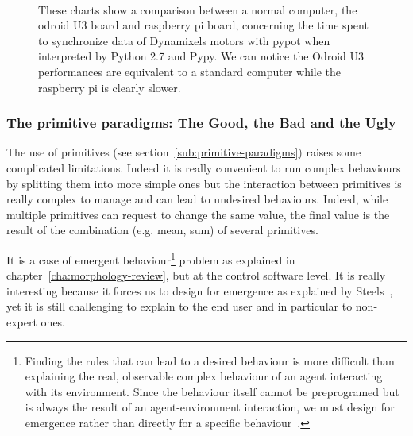 
\begin{figure}[tb]
\centering
    \\
    \hfill
    \caption{These charts show a comparison between a normal computer, the odroid U3 board and raspberry pi board, concerning the time spent to synchronize data of Dynamixels motors with pypot when interpreted by Python 2.7 and Pypy. We can notice the Odroid U3 performances are equivalent to a standard computer while the raspberry pi is clearly slower.}
    \label{fig:pypot-board-comparaison}
\end{figure}



\subsubsection{The primitive paradigms: The Good, the Bad and the Ugly}
\label{sec:pypot-primitives-problems}

The use of primitives (see section~\ref{sub:primitive-paradigms}) raises some complicated limitations. Indeed it is really convenient to run complex behaviours by splitting them into more simple ones but the interaction between primitives is really complex to manage and can lead to undesired behaviours. Indeed, while multiple primitives can request to change the same value, the final value is the result of the combination (e.g. mean, sum) of several primitives.


It is a case of emergent behaviour\footnote{Finding the rules that can lead to a desired behaviour is more difficult than explaining the real, observable complex behaviour of an agent interacting with its environment. Since the behaviour itself cannot be preprogramed but is always the result of an agent-environment interaction, we must design for emergence rather than directly for a specific behaviour~\parencite{Pfeifer06}.} problem as explained in chapter~\ref{cha:morphology-review}, but at the control software level. It is really interesting because it forces us to design  for emergence as explained by Steels~\parencite{Steels1991emergence}, yet it is still challenging to explain to the end user and in particular to non-expert ones.


